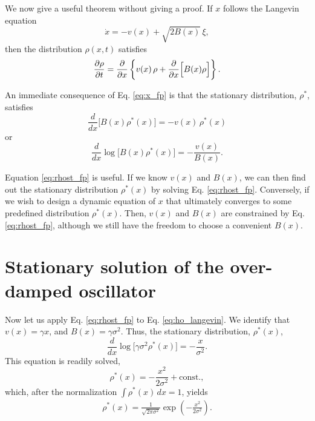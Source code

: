\documentclass[11pt]{article}
\begin{document}
We now give a useful theorem without giving a proof.
%
If $x$ follows the Langevin equation
\begin{equation}
  \dot x = -v(x) + \sqrt{ 2 B(x) } \, \xi,
  \label{eq:x_langevin}
\end{equation}
then the distribution $\rho(x, t)$ satisfies
\begin{equation}
\frac { \partial \rho } { \partial t }
=
\frac { \partial } { \partial x }
\left\{
  v(x) \, \rho
  +
\frac { \partial  } { \partial x } \Bigl[ B(x) \rho \Bigr]
\right\}.
\label{eq:x_fp}
\end{equation}

An immediate consequence of Eq. \eqref{eq:x_fp} is that
the stationary distribution, $\rho^*$, satisfies
\begin{equation*}
  \frac { d } { d x } \bigl[ B(x) \rho^*(x) \bigr]
=
  - v(x) \, \rho^*(x)
\end{equation*}
or
\begin{equation}
  \frac { d } { d x } \log\bigl[ B(x) \rho^*(x) \bigr]
=
  - \frac{ v(x) }{ B(x) }.
\label{eq:rhost_fp}
\end{equation}

Equation \eqref{eq:rhost_fp} is useful.
%
If we know $v(x)$ and $B(x)$,
we can then find out the stationary distribution $\rho^*(x)$
by solving Eq. \eqref{eq:rhost_fp}.
%
Conversely,
if we wish to design a dynamic equation of $x$
that ultimately converges to some predefined distribution $\rho^*(x)$.
%
Then, $v(x)$ and $B(x)$ are constrained by Eq. \eqref{eq:rhost_fp},
although we still have the freedom to choose a convenient $B(x)$.



\section{Stationary solution of the over-damped oscillator}



Now let us apply Eq. \eqref{eq:rhost_fp} to Eq. \eqref{eq:ho_langevin}.
%
We identify that
$v(x) = \gamma x$,
and
$B(x) = \gamma \sigma^2$.
%
Thus, the stationary distribution, $\rho^*(x)$,
\[
  \frac { d } { d x } \log\bigl[ \gamma \sigma^2 \rho^*(x) \bigr]
=
  - \frac{ x }{ \sigma^2 }.
\]
This equation is readily solved,
\[
  \rho^*(x)
=
  - \frac{ x^2 }{ 2 \sigma^2 }
  + \mathrm{const.},
\]
which,
after the normalization $\int \rho^*(x) \, dx = 1$,
yields
\begin{align}
\rho^*(x)
=
\frac{ 1 } { \sqrt{ 2 \pi \sigma^2 } }
\exp\left(
  -\frac{ x^2 } { 2 \sigma^2 }
\right).
\label{eq:ho_rhost}
\end{align}
\end{document}
